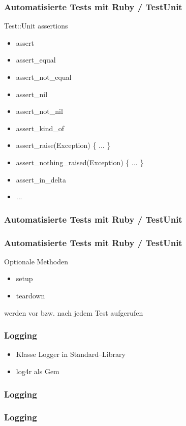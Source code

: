 \documentclass{beamer}
\begin{document}
\begin{frame}
  \frametitle{Automatisierte Tests mit Ruby / TestUnit}
  Test::Unit assertions
  \begin{itemize}
    \item assert
    \item assert\_equal
    \item assert\_not\_equal
    \item assert\_nil
    \item assert\_not\_nil
    \item assert\_kind\_of
    \item assert\_raise(Exception) \{ ... \}
    \item assert\_nothing\_raised(Exception) \{ ... \}
    \item assert\_in\_delta
    \item ...
  \end{itemize}
\end{frame}

\begin{frame}[containsverbatim]
  \frametitle{Automatisierte Tests mit Ruby / TestUnit}
  
\end{frame}

\begin{frame}
  \frametitle{Automatisierte Tests mit Ruby / TestUnit}
Optionale Methoden 
\begin{itemize}
  \item setup
  \item teardown
\end{itemize}
werden vor bzw. nach jedem Test aufgerufen
\end{frame}

\begin{frame}
  \frametitle{Logging}
  \begin{itemize}
    \item Klasse Logger in Standard--Library
    \item log4r als Gem
  \end{itemize}
\end{frame}

\begin{frame}
  \frametitle{Logging}
  
\end{frame}

\begin{frame}
  \frametitle{Logging}
  
\end{frame}
\end{document}
